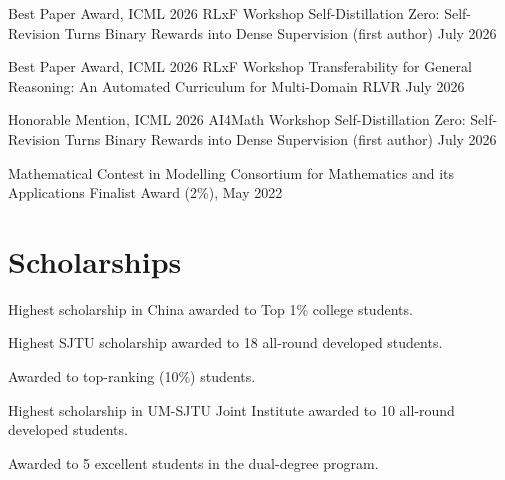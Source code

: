 \documentclass[a4paper,11pt]{article}
\begin{document}
\resumeProject
  {Best Paper Award, ICML 2026 RLxF Workshop}
  {Self-Distillation Zero: Self-Revision Turns Binary Rewards into Dense Supervision (first author)}
  {July 2026}
  {}

\resumeProject
  {Best Paper Award, ICML 2026 RLxF Workshop}
  {Transferability for General Reasoning: An Automated Curriculum for Multi-Domain RLVR}
  {July 2026}
  {}

\resumeProject
  {Honorable Mention, ICML 2026 AI4Math Workshop}
  {Self-Distillation Zero: Self-Revision Turns Binary Rewards into Dense Supervision (first author)}
  {July 2026}
  {}

\resumeProject
  {Mathematical Contest in Modelling}
  {Consortium for Mathematics and its Applications}
  {Finalist Award (2\%), May 2022}
  {}

\resumeSubHeadingListEnd
\vspace{-6mm}

\section{\textbf{Scholarships}}
\vspace{-0.4mm}
\resumeSubHeadingListStart

\resumeItemListStart
  \item Highest scholarship in China awarded to Top 1\% college students.
\resumeItemListEnd

\resumeItemListStart
  \item Highest SJTU scholarship awarded to 18 all-round developed students.
\resumeItemListEnd

\resumeItemListStart
  \item Awarded to top-ranking (10\%) students.
\resumeItemListEnd

\resumeItemListStart
  \item Highest scholarship in UM-SJTU Joint Institute awarded to 10 all-round developed students.
\resumeItemListEnd

\resumeItemListStart
  \item Awarded to 5 excellent students in the dual-degree program.
\resumeItemListEnd
\end{document}

